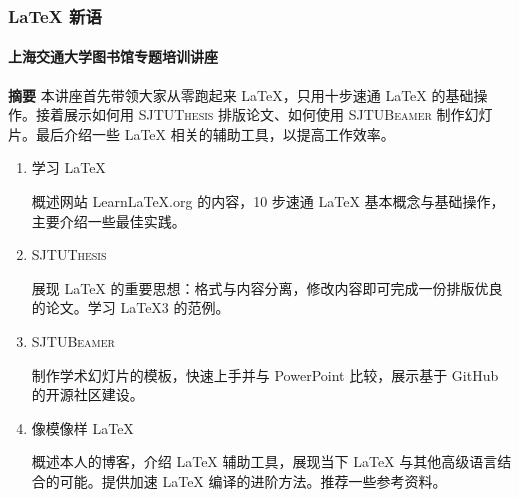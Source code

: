 \documentclass[UTF8]{ctexbeamer}
\begin{document}
    \begin{frame}
        \frametitle{\LaTeX{} 新语}
        \framesubtitle{上海交通大学图书馆专题培训讲座}

        {\scriptsize \textbf{摘要} 本讲座首先带领大家从零跑起来 \LaTeX{}，只用十步速通 \LaTeX{} 的基础操作。接着展示如何用 \textsc{SJTUThesis} 排版论文、如何使用 \textsc{SJTUBeamer} 制作幻灯片。最后介绍一些 \LaTeX{} 相关的辅助工具，以提高工作效率。\par}

        \begin{enumerate}
            \item 学习 \LaTeX{}
            
            {\scriptsize 概述网站 Learn\LaTeX{}.org 的内容，10 步速通 \LaTeX{} 基本概念与基础操作，主要介绍一些最佳实践。 \par}
            \item \textsc{SJTUThesis}
            
            {\scriptsize 展现 \LaTeX{} 的重要思想：格式与内容分离，修改内容即可完成一份排版优良的论文。学习 \LaTeX3 的范例。 \par}
            \item \textsc{SJTUBeamer}
            
            {\scriptsize 制作学术幻灯片的模板，快速上手并与 PowerPoint 比较，展示基于 GitHub 的开源社区建设。 \par}

            \item 像模像样 \LaTeX{}
            
            {\scriptsize 概述本人的博客，介绍 \LaTeX{} 辅助工具，展现当下 \LaTeX{} 与其他高级语言结合的可能。提供加速 \LaTeX{} 编译的进阶方法。推荐一些参考资料。\par}
        \end{enumerate}
    \end{frame}
\end{document}
